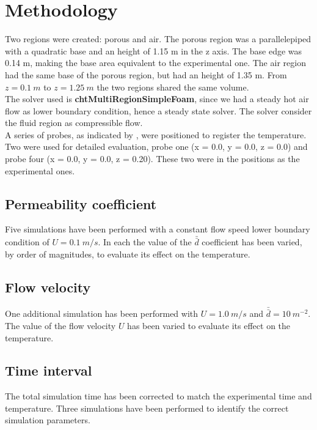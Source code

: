 
\section{Methodology}
\label{section:methodology}

Two regions were created: porous and air.
The porous region was a parallelepiped with a quadratic base and an height of
1.15 m in the z axis. The base edge was 0.14 m, making the base area
equivalent to the experimental one.
The air region had the same base of the porous region, but had an height of
1.35 m.
From $z=0.1 ~m$ to $z=1.25 ~m$ the two regions shared the same volume.\\
The solver used is \textbf{chtMultiRegionSimpleFoam}, since we had a steady hot
air flow as lower boundary condition, hence a steady state solver.
The solver consider the fluid region as compressible flow.\\
A series of probes, as indicated by \textcite{RegionProbe}, were positioned to
register the temperature.
Two were used for detailed evaluation, probe one (x = 0.0, y = 0.0, z = 0.0) and
probe four (x = 0.0, y = 0.0, z = 0.20). These two were in the positions as the
experimental ones.

\subsection{Permeability coefficient}
\label{subsection:permeabilitycoefficient}

Five simulations have been performed with a constant flow speed lower boundary
condition of $U = 0.1 ~m/s$.
In each the value of the $\bar{\bar{d}}$ coefficient has been varied, by order
of magnitudes, to evaluate its effect on the temperature.

\subsection{Flow velocity}
\label{subsection:flowvelocity}

One additional simulation has been performed with $U = 1.0 ~m/s$ and
$\bar{\bar{d}} = 10 ~m^{-2}$.
The value of the flow velocity $U$ has been varied to
evaluate its effect on the temperature.

\subsection{Time interval}
\label{subsection:timeinterval}

The total simulation time has been corrected to match the experimental time and
temperature.
Three simulations have been performed to identify the correct simulation
parameters.

